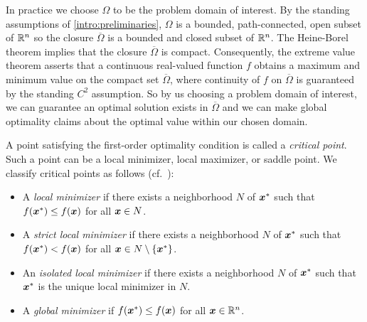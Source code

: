 \documentclass[10pt]{article}
\begin{document}
        In practice we choose $\Omega$ to be the problem domain of interest.
        By the standing assumptions of \ref{intro:preliminaries},
        $\Omega$ is a bounded, path-connected, open subset of $\mathbb{R}^n$ so
        the closure $\overline{\Omega}$ is a bounded and closed subset of
        $\mathbb{R}^n$. The Heine-Borel theorem implies that the closure $\overline{\Omega}$ is compact.
        Consequently, the extreme value theorem asserts that a continuous real-valued function $f$
        obtains a maximum and minimum value on the compact set $\overline{\Omega}$, where continuity
        of $f$ on $\overline\Omega$ is guaranteed by the standing $C^{2}$ assumption.
        So by us choosing a problem domain of interest, we can guarantee an optimal solution
        exists in $\overline{\Omega}$ and we can make global optimality claims about the optimal
        value within our chosen domain. 

        \medskip
        
        A point satisfying the first-order optimality condition is called a \emph{critical point}. 
        Such a point can be a local minimizer, local maximizer, or saddle point. We classify critical 
        points as follows (cf.~\cite{NocedalAndWright06}):
        \begin{itemize}
            \item A \emph{local minimizer} if there exists a neighborhood $N$ of $\bm{x}^*$ such that 
            $f(\bm{x}^*) \leq f(\bm{x})$ for all $\bm{x} \in N$.
            \item A \emph{strict local minimizer} if there exists a neighborhood $N$ of $\bm{x}^*$ 
            such that $f(\bm{x}^*) < f(\bm{x})$ for all $\bm{x} \in N \setminus \{\bm{x}^*\}$.
            \item An \emph{isolated local minimizer} if there exists a neighborhood $N$ of 
            $\bm{x}^*$ such that $\bm{x}^*$ is the unique local minimizer in $N$.
            \item A \emph{global minimizer} if $f(\bm{x}^*) \leq f(\bm{x})$ for all $\bm{x} \in \mathbb{R}^n$.
        \end{itemize}
\end{document}
